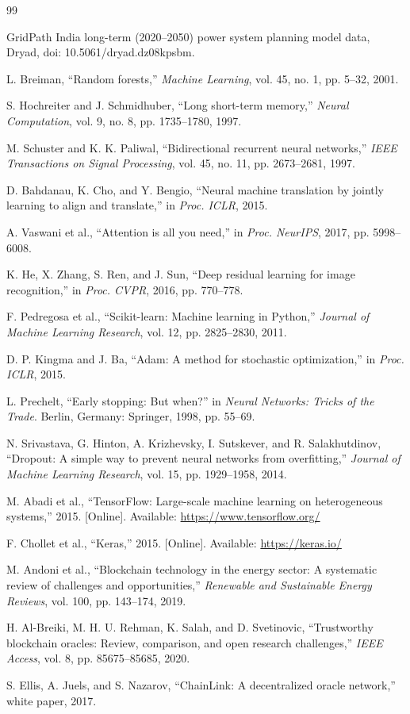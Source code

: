 \documentclass[journal]{IEEEtran}
\begin{document}
\begin{thebibliography}{99}

GridPath India long-term (2020--2050) power system planning model data, Dryad, doi: 10.5061/dryad.dz08kpsbm.

L. Breiman, ``Random forests,'' \emph{Machine Learning}, vol. 45, no. 1, pp. 5--32, 2001.

S. Hochreiter and J. Schmidhuber, ``Long short-term memory,'' \emph{Neural Computation}, vol. 9, no. 8, pp. 1735--1780, 1997.

M. Schuster and K. K. Paliwal, ``Bidirectional recurrent neural networks,'' \emph{IEEE Transactions on Signal Processing}, vol. 45, no. 11, pp. 2673--2681, 1997.

D. Bahdanau, K. Cho, and Y. Bengio, ``Neural machine translation by jointly learning to align and translate,'' in \emph{Proc. ICLR}, 2015.

A. Vaswani et al., ``Attention is all you need,'' in \emph{Proc. NeurIPS}, 2017, pp. 5998--6008.

K. He, X. Zhang, S. Ren, and J. Sun, ``Deep residual learning for image recognition,'' in \emph{Proc. CVPR}, 2016, pp. 770--778.

F. Pedregosa et al., ``Scikit-learn: Machine learning in Python,'' \emph{Journal of Machine Learning Research}, vol. 12, pp. 2825--2830, 2011.

D. P. Kingma and J. Ba, ``Adam: A method for stochastic optimization,'' in \emph{Proc. ICLR}, 2015.

L. Prechelt, ``Early stopping: But when?'' in \emph{Neural Networks: Tricks of the Trade}. Berlin, Germany: Springer, 1998, pp. 55--69.

N. Srivastava, G. Hinton, A. Krizhevsky, I. Sutskever, and R. Salakhutdinov, ``Dropout: A simple way to prevent neural networks from overfitting,'' \emph{Journal of Machine Learning Research}, vol. 15, pp. 1929--1958, 2014.

M. Abadi et al., ``TensorFlow: Large-scale machine learning on heterogeneous systems,'' 2015. [Online]. Available: \url{https://www.tensorflow.org/}

F. Chollet et al., ``Keras,'' 2015. [Online]. Available: \url{https://keras.io/}

M. Andoni et al., ``Blockchain technology in the energy sector: A systematic review of challenges and opportunities,'' \emph{Renewable and Sustainable Energy Reviews}, vol. 100, pp. 143--174, 2019.

H. Al-Breiki, M. H. U. Rehman, K. Salah, and D. Svetinovic, ``Trustworthy blockchain oracles: Review, comparison, and open research challenges,'' \emph{IEEE Access}, vol. 8, pp. 85675--85685, 2020.

S. Ellis, A. Juels, and S. Nazarov, ``ChainLink: A decentralized oracle network,'' white paper, 2017.

\end{thebibliography}
\end{document}
